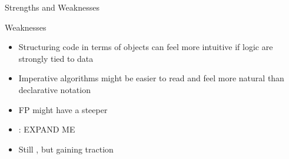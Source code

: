 \begin{frame}{Strengths and Weaknesses}
\begin{block}{Weaknesses}
	\begin{itemize}
		\item Structuring code in terms of objects can feel more intuitive if logic  are strongly tied to data 
		\item Imperative algorithms might be easier to read and feel more natural than declarative notation
		\item FP might have a steeper  
		\item {} : EXPAND ME
		\item Still , but gaining traction
	\end{itemize}
\end{block}
\end{frame}
